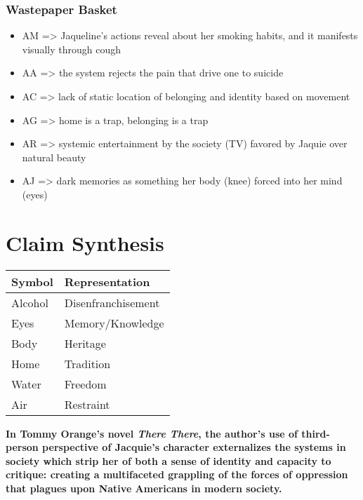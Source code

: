 \documentclass[letterpaper]{article}
\begin{document}
\subsubsection{Wastepaper Basket}
\label{sec:org73d9ed3}
\begin{itemize}
\item AM => Jaqueline's actions reveal about her smoking habits, and it manifests visually through cough
\item AA => the system rejects the pain that drive one to suicide
\item AC => lack of static location of belonging and identity based on movement
\item AG => home is a trap, belonging is a trap
\item AR => systemic entertainment by the society (TV) favored by Jaquie over natural beauty
\item AJ => dark memories as something her body (knee) forced into her mind (eyes)
\end{itemize}



\section{Claim Synthesis}
\label{sec:org287e56c}

\begin{center}
\begin{tabular}{ll}
Symbol & Representation\\
\hline
Alcohol & Disenfranchisement\\
Eyes & Memory/Knowledge\\
Body & Heritage\\
Home & Tradition\\
Water & Freedom\\
Air & Restraint\\
\end{tabular}
\end{center}

\textbf{In Tommy Orange's novel \emph{There There}, the author's use of third-person perspective of Jacquie's character externalizes the systems in society which strip her of both a sense of identity and capacity to critique: creating a multifaceted grappling of the forces of oppression that plagues upon Native Americans in modern society.}
\end{document}
